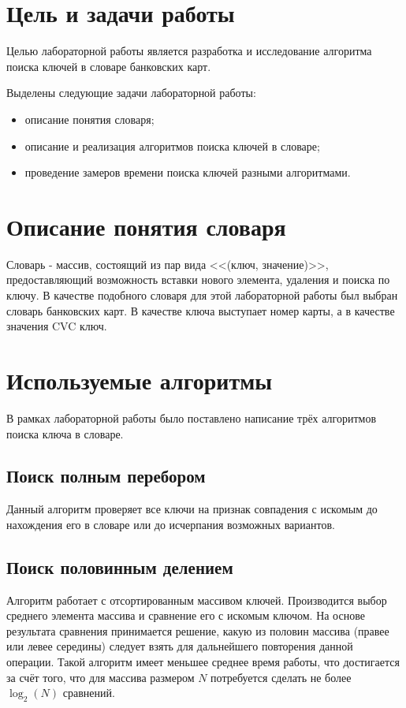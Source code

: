 \section{Цель и задачи работы}
Целью лабораторной работы является разработка и исследование алгоритма поиска ключей в словаре банковских карт.

Выделены следующие задачи лабораторной работы:

\begin{itemize}
\item описание понятия словаря;
\item описание и реализация алгоритмов поиска ключей в словаре;
\item проведение замеров времени поиска ключей разными алгоритмами.
\end{itemize}

\section{Описание понятия словаря}
Словарь - массив, состоящий из пар вида <<(ключ, значение)>>, предоставляющий возможность вставки нового элемента, удаления и поиска по ключу\cite{Corman}. В качестве подобного словаря для этой лабораторной работы был выбран словарь банковских карт. В качестве ключа выступает номер карты, а в качестве значения CVC ключ.


\section{Используемые алгоритмы}
В рамках лабораторной работы было поставлено написание трёх алгоритмов поиска ключа в словаре.

\subsection{Поиск полным перебором}
	Данный алгоритм проверяет все ключи на признак совпадения с искомым до нахождения его в словаре или до исчерпания возможных вариантов.

\subsection{Поиск половинным делением}
	Алгоритм работает с отсортированным массивом ключей. Производится выбор среднего элемента массива и сравнение его с искомым ключом. На основе результата сравнения принимается решение, какую из половин массива (правее или левее середины) следует взять для дальнейшего повторения данной операции. Такой алгоритм имеет меньшее среднее время работы, что достигается за счёт того, что для массива размером $N$ потребуется сделать не более $\log_{2}(N)$ сравнений.
	
